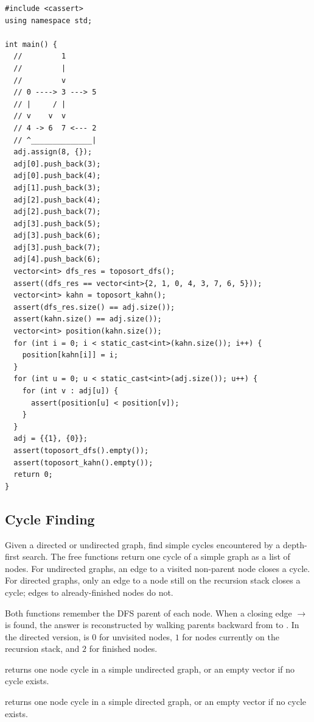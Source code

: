 \begin{lstlisting}[style=cpp]
#include <cassert>
using namespace std;

int main() {
  //         1
  //         |
  //         v
  // 0 ----> 3 ---> 5
  // |     / |
  // v    v  v
  // 4 -> 6  7 <--- 2
  // ^______________|
  adj.assign(8, {});
  adj[0].push_back(3);
  adj[0].push_back(4);
  adj[1].push_back(3);
  adj[2].push_back(4);
  adj[2].push_back(7);
  adj[3].push_back(5);
  adj[3].push_back(6);
  adj[3].push_back(7);
  adj[4].push_back(6);
  vector<int> dfs_res = toposort_dfs();
  assert((dfs_res == vector<int>{2, 1, 0, 4, 3, 7, 6, 5}));
  vector<int> kahn = toposort_kahn();
  assert(dfs_res.size() == adj.size());
  assert(kahn.size() == adj.size());
  vector<int> position(kahn.size());
  for (int i = 0; i < static_cast<int>(kahn.size()); i++) {
    position[kahn[i]] = i;
  }
  for (int u = 0; u < static_cast<int>(adj.size()); u++) {
    for (int v : adj[u]) {
      assert(position[u] < position[v]);
    }
  }
  adj = {{1}, {0}};
  assert(toposort_dfs().empty());
  assert(toposort_kahn().empty());
  return 0;
}
\end{lstlisting}
\subsection{Cycle Finding}
\label{sec:4.1.3}
Given a directed or undirected graph, find simple cycles encountered by a depth-first search. The free functions return one cycle of a simple graph as a list of nodes. For undirected graphs, an edge to a visited non-parent node closes a cycle. For directed graphs, only an edge to a node still on the recursion stack closes a cycle; edges to already-finished nodes do not.

Both functions remember the DFS parent of each node. When a closing edge  $\to$  is found, the answer is reconstructed by walking parents backward from  to . In the directed version,  is $0$ for unvisited nodes, $1$ for nodes currently on the recursion stack, and $2$ for finished nodes.

\begin{compactitem}
  \item {} returns one node cycle in a simple undirected graph, or an empty vector if no cycle exists.
  \item {} returns one node cycle in a simple directed graph, or an empty vector if no cycle exists.
\end{compactitem}

